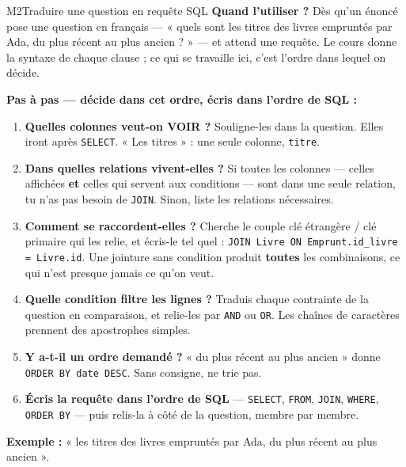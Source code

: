 \begin{fichemethode}{M2}{Traduire une question en requête SQL}
\textbf{Quand l'utiliser ?} Dès qu'un énoncé pose une question en français — « quels sont les
titres des livres empruntés par Ada, du plus récent au plus ancien ? » — et attend une
requête. Le cours donne la syntaxe de chaque clause ; ce qui se travaille ici, c'est l'ordre
dans lequel on décide.

\textbf{Pas à pas — décide dans cet ordre, écris dans l'ordre de SQL :}
\begin{enumerate}
  \item \textbf{Quelles colonnes veut-on VOIR ?} Souligne-les dans la question. Elles iront
    après \texttt{SELECT}. « Les titres » : une seule colonne, \texttt{titre}.
  \item \textbf{Dans quelles relations vivent-elles ?} Si toutes les colonnes — celles
    affichées \textbf{et} celles qui servent aux conditions — sont dans une seule relation,
    tu n'as pas besoin de \texttt{JOIN}. Sinon, liste les relations nécessaires.
  \item \textbf{Comment se raccordent-elles ?} Cherche le couple clé étrangère / clé primaire
    qui les relie, et écris-le tel quel :
    \texttt{JOIN Livre ON Emprunt.id\_livre = Livre.id}. Une jointure sans condition produit
    \textbf{toutes} les combinaisons, ce qui n'est presque jamais ce qu'on veut.
  \item \textbf{Quelle condition filtre les lignes ?} Traduis chaque contrainte de la question
    en comparaison, et relie-les par \texttt{AND} ou \texttt{OR}. Les chaînes de caractères
    prennent des apostrophes simples.
  \item \textbf{Y a-t-il un ordre demandé ?} « du plus récent au plus ancien » donne
    \texttt{ORDER BY date DESC}. Sans consigne, ne trie pas.
  \item \textbf{Écris la requête dans l'ordre de SQL} — \texttt{SELECT}, \texttt{FROM},
    \texttt{JOIN}, \texttt{WHERE}, \texttt{ORDER BY} — puis relis-la à côté de la question,
    membre par membre.
\end{enumerate}

\textbf{Exemple :} « les titres des livres empruntés par Ada, du plus récent au plus ancien ».


\end{fichemethode}
